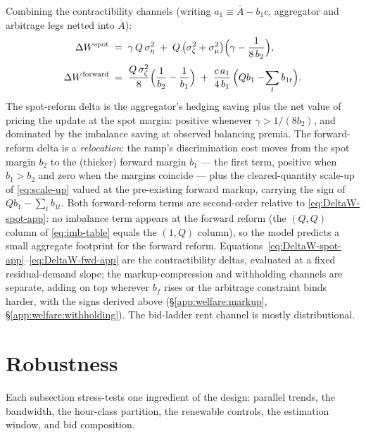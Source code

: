 \documentclass[11pt,a4paper]{article}
\theoremstyle{definition}
\theoremstyle{remark}
\theoremstyle{plain}
\begin{document}
Combining the contractibility channels (writing $a_1 \equiv \bar A - b_1 c$, aggregator and arbitrage legs netted into $\bar A$):
\begin{align}
\Delta W^{\text{spot}} \;&=\; \gamma\, Q\, \sigma_\eta^2 \;+\; Q\,\bigl(\sigma_\zeta^2 + \sigma_\mu^2\bigr)\Bigl(\gamma - \frac{1}{8\, b_2}\Bigr), \label{eq:DeltaW-spot-app}\\[2pt]
\Delta W^{\text{forward}} \;&=\; \frac{Q\, \sigma_\zeta^2}{8}\Bigl(\frac{1}{b_2} - \frac{1}{b_1}\Bigr) \;+\; \frac{c\, a_1}{4\, b_1}\,\Big(Q b_1 - \!\sum_t b_{1t}\Big). \label{eq:DeltaW-fwd-app}
\end{align}
The spot-reform delta is the aggregator's hedging saving plus the net value of pricing the update at the spot margin: positive whenever $\gamma > 1/(8 b_2)$, and dominated by the imbalance saving at observed balancing premia. The forward-reform delta is a \emph{relocation}: the ramp's discrimination cost moves from the spot margin $b_2$ to the (thicker) forward margin $b_1$ --- the first term, positive when $b_1 > b_2$ and zero when the margins coincide --- plus the cleared-quantity scale-up of \eqref{eq:scale-up} valued at the pre-existing forward markup, carrying the sign of $Q b_1 - \sum_t b_{1t}$. Both forward-reform terms are second-order relative to \eqref{eq:DeltaW-spot-app}: no imbalance term appears at the forward reform (the $(Q,Q)$ column of \eqref{eq:imb-table} equals the $(1,Q)$ column), so the model predicts a small aggregate footprint for the forward reform. Equations~\eqref{eq:DeltaW-spot-app}--\eqref{eq:DeltaW-fwd-app} are the contractibility deltas, evaluated at a fixed residual-demand slope; the markup-compression and withholding channels are separate, adding on top wherever $b_f$ rises or the arbitrage constraint binds harder, with the signs derived above (\S\ref{app:welfare:markup}, \S\ref{app:welfare:withholding}). The bid-ladder rent channel is mostly distributional.

\section{Robustness}\label{app:robustness}

Each subsection stress-tests one ingredient of the design: parallel trends, the bandwidth, the hour-class partition, the renewable controls, the estimation window, and bid composition.
\end{document}
